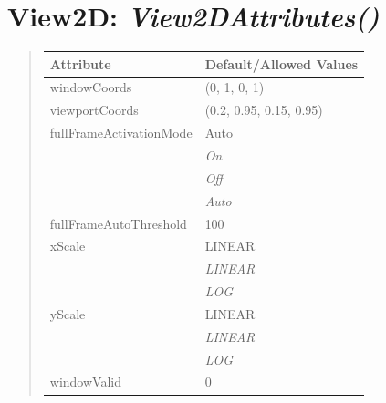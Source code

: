 \documentclass[letterpaper,10pt,english]{sphinxmanual}
\begin{document}
\begin{DUlineblock}{0em}
\item[] 
\end{DUlineblock}


\section{\textbf{View2D}: \emph{View2DAttributes()}}
\label{attributes:view2d-view2dattributes}
\begin{DUlineblock}{0em}
\item[] 
\end{DUlineblock}
\begin{quote}

\begin{tabulary}{\linewidth}{|L|L|}
\hline

\textbf{Attribute}
 & 
\textbf{Default/Allowed Values}
\\
\hline
windowCoords
 & 
(0, 1, 0, 1)
\\
\hline
viewportCoords
 & 
(0.2, 0.95, 0.15, 0.95)
\\
\hline
fullFrameActivationMode
 & 
Auto
\\
\hline & 
\emph{On}
\\
\hline & 
\emph{Off}
\\
\hline & 
\emph{Auto}
\\
\hline
fullFrameAutoThreshold
 & 
100
\\
\hline
xScale
 & 
LINEAR
\\
\hline & 
\emph{LINEAR}
\\
\hline & 
\emph{LOG}
\\
\hline
yScale
 & 
LINEAR
\\
\hline & 
\emph{LINEAR}
\\
\hline & 
\emph{LOG}
\\
\hline
windowValid
 & 
0
\\
\hline\end{tabulary}

\end{quote}

\begin{DUlineblock}{0em}
\item[] 
\end{DUlineblock}

\begin{DUlineblock}{0em}
\item[] 
\end{DUlineblock}
\end{document}

